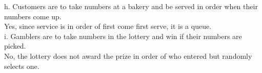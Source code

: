 \documentclass[12pt]{article}
\newenvironment{problem}[2][Problem]{\begin{trivlist}
\item[\hskip \labelsep {\bfseries #1}\hskip \labelsep {\bfseries #2.}]}{\end{trivlist}}
\begin{document}
\begin{problem}{3}
    h. Customers are to take numbers at a bakery and be served in order when their numbers come up.\\
    Yes, since service is in order of first come first serve, it is a queue.\\

    i. Gamblers are to take numbers in the lottery and win if their numbers are picked.\\
    No, the lottery does not award the prize in order of who entered but randomly selects one.

    
\end{problem}
 
\end{document}
